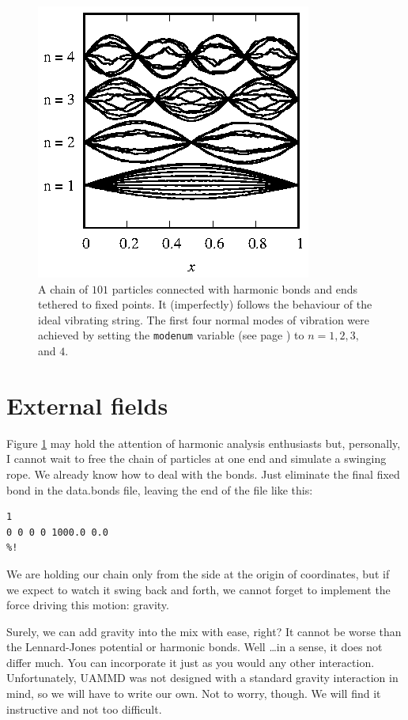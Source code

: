 \begin{figure}
  \centering
  \includegraphics[width = 0.6 \textwidth]{figures/vibratingString.eps}
  \caption{\label{vibratingString}A chain of $101$ particles connected with
           harmonic bonds and ends tethered to fixed points. It (imperfectly)
           follows the behaviour of the ideal vibrating string. The first four
           normal modes of vibration were achieved by setting the
           \texttt{modenum} variable (see page
           \pageref{stringInitialConditions}) to $n = 1, 2, 3,$ and $4$.}
\end{figure}

\section{External fields}

Figure \ref{vibratingString} may hold the attention of harmonic analysis
enthusiasts but, personally, I cannot wait to free the chain of particles at one
end and simulate a swinging rope. We already know how to deal with the bonds.
Just eliminate the final fixed bond in the data.bonds file, leaving the end of
the file like this:
\begin{lstlisting}
1
0 0 0 0 1000.0 0.0
%!
\end{lstlisting}

We are holding our chain only from the side at the origin of coordinates, but if
we expect to watch it swing back and forth, we cannot forget to implement the
force driving this motion: gravity.

Surely, we can add gravity into the mix with ease, right? It cannot be worse
than the Lennard-Jones potential or harmonic bonds. Well \ldots in a sense, it
does not differ much. You can incorporate it just as you would any other
interaction. Unfortunately, UAMMD was not designed with a standard gravity
interaction in mind, so we will have to write our own. Not to worry, though. We
will find it instructive and not too difficult.

